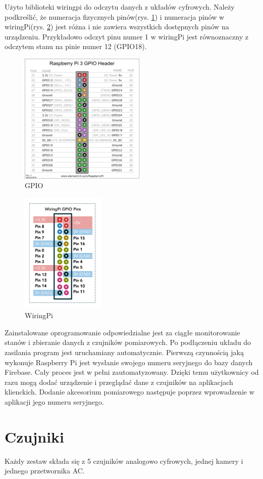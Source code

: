 Użyto biblioteki wiringpi do odczytu danych z układów cyfrowych. Należy podkreślić, że numeracja fizycznych pinów(rys. \ref{gpio}) i numeracja pinów w wiringPi(rys. \ref{wiringpi}) jest różna i nie zawiera wszystkich dostępnych pinów na urządzeniu. Przykładowo odczyt pinu numer 1 w wiringPi jest równoznaczny z odczytem stanu na pinie numer 12 (GPIO18).
\begin{figure}[ht]
	\centering
	\includegraphics[width=6cm]{gpio.png}
        \caption{GPIO \cite{gpio}}
        \label{gpio}
\end{figure}
\begin{figure}[ht]
	\centering
	\includegraphics[width=4cm]{wiringpi.png}
        \caption{WiringPi \cite{wiringpi}}
        \label{wiringpi}
\end{figure}
Zainstalowane oprogramowanie odpowiedzialne jest za ciągłe monitorowanie stanów i zbieranie danych z czujników pomiarowych. Po podłączeniu układu do zasilania program jest uruchamiany automatycznie. Pierwszą czynnością jaką wykonuje Raspberry Pi jest wysłanie swojego numeru seryjnego do bazy danych Firebase. Cały proces jest w pełni zautomatyzowany. Dzięki temu użytkownicy od razu mogą dodać urządzenie i przeglądać dane z czujników na aplikacjach klienckich. Dodanie akcesorium pomiarowego następuje poprzez wprowadzenie w aplikacji jego numeru seryjnego.
\section{Czujniki}
Każdy zestaw składa się z 5 czujników analogowo cyfrowych,  jednej kamery i jednego przetwornika AC. 
